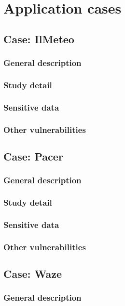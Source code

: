 \chapter{Application cases}
\label{chap:use_cases}

	\section{Case: IlMeteo}
		\subsection{General description}
		\subsection{Study detail}
		\subsection{Sensitive data}
		\subsection{Other vulnerabilities}

	\section{Case: Pacer}
		\subsection{General description}
		\subsection{Study detail}
		\subsection{Sensitive data}
		\subsection{Other vulnerabilities}

	\section{Case: Waze}
		\subsection{General description}
